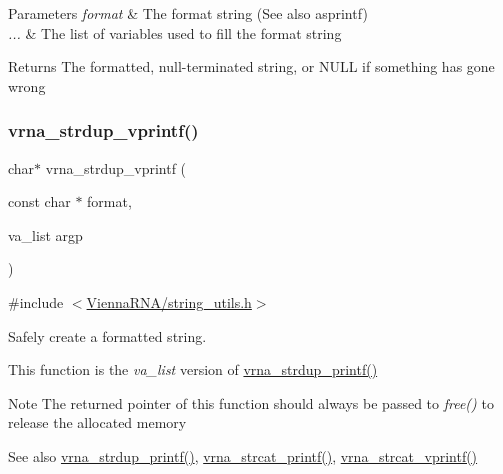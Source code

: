 \begin{DoxyParams}{Parameters}
{\em format} & The format string (See also asprintf) \\
\hline
{\em ...} & The list of variables used to fill the format string \\
\hline
\end{DoxyParams}
\begin{DoxyReturn}{Returns}
The formatted, null-\/terminated string, or N\+U\+LL if something has gone wrong 
\end{DoxyReturn}
\mbox{\label{group__string__utils_ga459fdee190ed81bb7773cbaf671748a9}} 
\subsubsection{\texorpdfstring{vrna\+\_\+strdup\+\_\+vprintf()}{vrna\_strdup\_vprintf()}}
{\footnotesize\ttfamily char$\ast$ vrna\+\_\+strdup\+\_\+vprintf (\begin{DoxyParamCaption}\item[{const char $\ast$}]{format,  }\item[{va\+\_\+list}]{argp }\end{DoxyParamCaption})}



{\ttfamily \#include $<$\hyperlink{string__utils_8h}{Vienna\+R\+N\+A/string\+\_\+utils.\+h}$>$}



Safely create a formatted string. 

This function is the {\itshape va\+\_\+list} version of \hyperlink{group__string__utils_ga33cc0190a326ec368277caa777b8bf18}{vrna\+\_\+strdup\+\_\+printf()}

\begin{DoxyNote}{Note}
The returned pointer of this function should always be passed to {\itshape free()} to release the allocated memory
\end{DoxyNote}
\begin{DoxySeeAlso}{See also}
\hyperlink{group__string__utils_ga33cc0190a326ec368277caa777b8bf18}{vrna\+\_\+strdup\+\_\+printf()}, \hyperlink{group__string__utils_gac0771ec71316023067f2aae61a5aa0fb}{vrna\+\_\+strcat\+\_\+printf()}, \hyperlink{group__string__utils_ga122df216996ba62fd5056b7743e3131a}{vrna\+\_\+strcat\+\_\+vprintf()}
\end{DoxySeeAlso}

